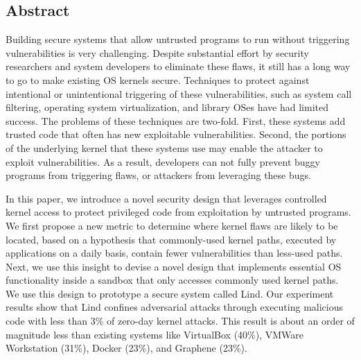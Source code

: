 \subsection*{Abstract}
Building secure systems that allow untrusted programs to run without
triggering vulnerabilities %
is very challenging. Despite
substantial effort by security researchers and system developers to
eliminate these flaws, it still has a long way to go to make existing OS 
kernels secure. 
Techniques to protect against intentional or unintentional triggering of
these vulnerabilities, such as system call filtering, operating system
virtualization, and library OSes have had limited success.  The problems
of these techniques are two-fold.  First, these systems add trusted code that often has new
exploitable vulnerabilities. Second, the portions of the underlying kernel
that these systems use may enable the attacker to exploit vulnerabilities.
As a result, developers can not fully prevent buggy programs from triggering
flaws, or attackers from leveraging these bugs. 

In this paper, we introduce a novel security design that leverages
controlled kernel access to protect privileged code from exploitation by
untrusted programs. 
We first propose a new metric to determine where kernel flaws are
likely to be located, based on a hypothesis that commonly-used kernel
paths, executed by applications on a daily basis, contain fewer
vulnerabilities than less-used paths. Next, we use this insight to devise a
novel design that implements essential OS functionality inside a
sandbox that only accesses commonly used kernel paths. 
We use this design to prototype a secure system called Lind. Our 
experiment results show that Lind confines adversarial attacks through 
executing malicious code with less than 
3\% of zero-day kernel attacks. This result is about an order of
magnitude less than existing systems like VirtualBox (40\%), 
VMWare Workstation (31\%), Docker (23\%), and Graphene (23\%).
